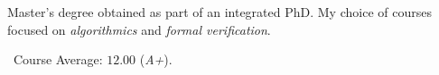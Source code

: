 Master's degree obtained as part of an integrated PhD. My choice of courses
focused on \emph{algorithmics} and \emph{formal verification}.

\medskip

\faGraduationCap\ Course Average: $12.00$ (\emph{A+}).
